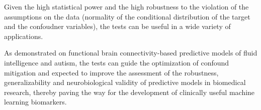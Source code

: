 \documentclass{article}
\begin{document}
Given the high statistical power and the high robustness to the violation of the assumptions on the data (normality of the conditional distribution of the target and the confoudner variables), the tests can be useful in a wide variety of applications.

As demonstrated on functional brain connectivity-based predictive models of fluid intelligence and autism, the tests can guide the optimization of confound mitigation and expected to improve the assessment of the robustness, generalizability and neurobiological validity of predictive models in biomedical research, thereby paving the way for the development of clinically useful machine learning biomarkers.

  


\newpage

\end{document}
